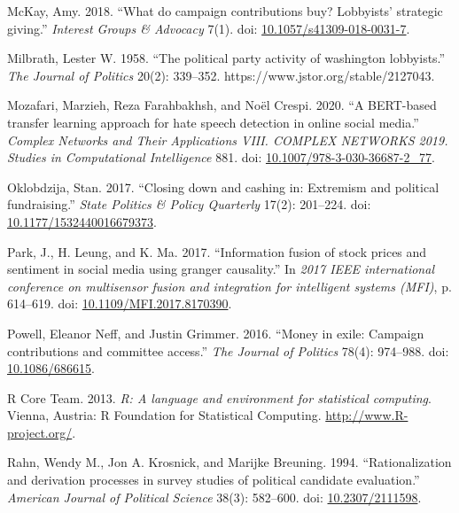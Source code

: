 \documentclass[12pt,]{article}
\newlength{\cslhangindent}
\newenvironment{CSLReferences}%
    {\setlength{\parindent}{0pt}%
    \everypar{\setlength{\hangindent}{\cslhangindent}}\ignorespaces}%
    {\par}
\begin{document}
\begin{CSLReferences}{1}{0}
\leavevmode{}%
McKay, Amy. 2018. {``What do campaign contributions buy? Lobbyists'
strategic giving.''} \emph{Interest Groups \& Advocacy} 7(1). doi:
\href{https://doi.org/10.1057/s41309-018-0031-7}{10.1057/s41309-018-0031-7}.

\leavevmode{}%
Milbrath, Lester W. 1958. {``The political party activity of washington
lobbyists.''} \emph{The Journal of Politics} 20(2): 339--352.
https://www.jstor.org/stable/2127043.

\leavevmode{}%
Mozafari, Marzieh, Reza Farahbakhsh, and Noël Crespi. 2020. {``A
BERT-based transfer learning approach for hate speech detection in
online social media.''} \emph{Complex Networks and Their Applications
VIII. COMPLEX NETWORKS 2019. Studies in Computational Intelligence} 881.
doi:
\href{https://doi.org/10.1007/978-3-030-36687-2_77}{10.1007/978-3-030-36687-2\_77}.

\leavevmode{}%
Oklobdzija, Stan. 2017. {``Closing down and cashing in: Extremism and
political fundraising.''} \emph{State Politics \& Policy Quarterly}
17(2): 201--224. doi:
\href{https://doi.org/10.1177/1532440016679373}{10.1177/1532440016679373}.

\leavevmode{}%
Park, J., H. Leung, and K. Ma. 2017. {``Information fusion of stock
prices and sentiment in social media using granger causality.''} In
\emph{2017 IEEE international conference on multisensor fusion and
integration for intelligent systems (MFI)}, p. 614--619. doi:
\href{https://doi.org/10.1109/MFI.2017.8170390}{10.1109/MFI.2017.8170390}.

\leavevmode{}%
Powell, Eleanor Neff, and Justin Grimmer. 2016. {``Money in exile:
Campaign contributions and committee access.''} \emph{The Journal of
Politics} 78(4): 974--988. doi:
\href{https://doi.org/10.1086/686615}{10.1086/686615}.

\leavevmode{}%
R Core Team. 2013. \emph{R: A language and environment for statistical
computing}. Vienna, Austria: R Foundation for Statistical Computing.
\url{http://www.R-project.org/}.

\leavevmode{}%
Rahn, Wendy M., Jon A. Krosnick, and Marijke Breuning. 1994.
{``Rationalization and derivation processes in survey studies of
political candidate evaluation.''} \emph{American Journal of Political
Science} 38(3): 582--600. doi:
\href{https://doi.org/10.2307/2111598}{10.2307/2111598}.


\end{CSLReferences}
\end{document}
